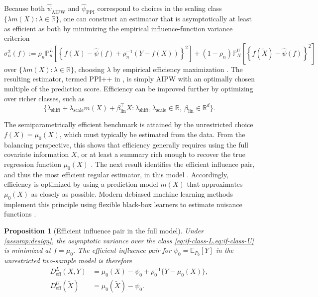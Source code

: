 \documentclass{article}
\theoremstyle{plain}
\newtheorem{proposition}{Proposition}
\theoremstyle{definition}
\newcommand{\E}{\mathbb{E}}
\newcommand{\1}{\mathbbm{1}}
\newcommand{\rhozero}{\rho_0}
\newcommand{\muzero}{\mu_0}
\newcommand{\Pl}{\mathbb{P}^{L}_n}
\newcommand{\Pu}{\mathbb{P}^{U}_N}
\begin{document}
Because both \(\widehat{\psi}_{\mathrm{AIPW}}\) and \(\widehat{\psi}_{\mathrm{PPI}}\) correspond to choices in the scaling class \(\{\lambda m(X):\lambda\in\mathbb R\}\), one can construct an estimator that is asymptotically at least as efficient as both by minimizing the empirical influence-function variance criterion
\[
\sigma_n^2(f)
:=
\rho_n \Pl\left[\left\{f(X)-\widehat{\psi}(f)+\rho_n^{-1}(Y-f(X))\right\}^2\right]
+
(1-\rho_n)\Pu\left[\left\{f(\widetilde X)-\widehat{\psi}(f)\right\}^2\right]
\]
over \(\{\lambda m(X): \lambda \in \mathbb{R}\}\), choosing \(\lambda\) by empirical efficiency maximization \citep{vanderlaanunified,rubin2008empirical}. The resulting estimator, termed PPI++ in \citet{angelopoulos2023ppi}, is simply AIPW with an optimally chosen multiple of the prediction score. Efficiency can be improved further by optimizing over richer classes, such as
\[
\{\lambda_{\mathrm{shift}} + \lambda_{\mathrm{scale}} m(X) + \beta_{\mathrm{lin}}^\top X : \lambda_{\mathrm{shift}}, \lambda_{\mathrm{scale}} \in \mathbb{R},\ \beta_{\mathrm{lin}} \in \mathbb{R}^d\}.
\]


The semiparametrically efficient benchmark is attained by the unrestricted choice \(f(X)=\mu_0(X)\), which must typically be estimated from the data. From the balancing perspective, this shows that efficiency generally requires using the full covariate information \(X\), or at least a summary rich enough to recover the true regression function \(\mu_0(X)\) \citep{robins1995analysis}. The next result identifies the efficient influence pair, and thus the most efficient regular estimator, in this model \citep{bickel1993efficient}. Accordingly, efficiency is optimized by using a prediction model \(m(X)\) that approximates \(\mu_0(X)\) as closely as possible. Modern debiased machine learning methods implement this principle using flexible black-box learners to estimate nuisance functions \citep{vanderlaanunified,vanderLaanRose2011,DoubleML}.



\begin{proposition}[Efficient influence pair in the full model]
\label{prop:eif-full}
Under \cref{assump:design}, the asymptotic variance over the class \cref{eq:if-class-L,eq:if-class-U} is minimized at \(f=\muzero\). The efficient influence pair for \(\psi_0=\E_{P_0}[Y]\) in the unrestricted two-sample model is therefore
\begin{align}
\label{eq:eif-full-L}
D_{\mathrm{eff}}^L(X,Y)
&=
\muzero(X)-\psi_0+\rhozero^{-1}\{Y-\muzero(X)\},\\
\label{eq:eif-full-U}
D_{\mathrm{eff}}^U(\widetilde X)
&=
\muzero(\widetilde X)-\psi_0.
\end{align}
\end{proposition}
 
\end{document}

